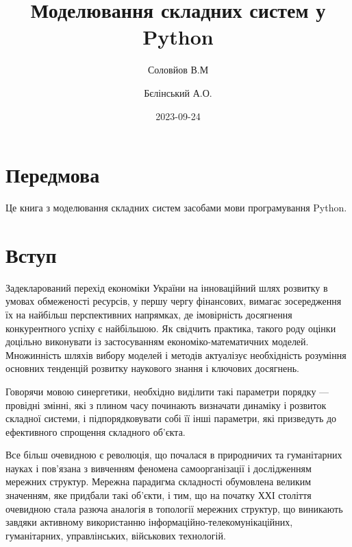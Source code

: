 \documentclass[
  letterpaper,
]{report}
\title{Моделювання складних систем у Python}
\author{Соловйов В.М \and Бєлінський А.О.}
\date{2023-09-24}
\renewcommand*\contentsname{Зміст}
\newcommand\contentsname{Зміст}
\begin{document}
\maketitle
\ifdefined\Shaded\renewenvironment{Shaded}{\begin{tcolorbox}[borderline west={3pt}{0pt}{shadecolor}, interior hidden, boxrule=0pt, breakable, frame hidden, enhanced, sharp corners]}{\end{tcolorbox}}\fi

\renewcommand*\contentsname{Зміст}
{
\hypersetup{linkcolor=}
\setcounter{tocdepth}{2}
\tableofcontents
}

\hypertarget{ux43fux435ux440ux435ux434ux43cux43eux432ux430}{%
\chapter*{Передмова}\label{ux43fux435ux440ux435ux434ux43cux43eux432ux430}}


Це книга з моделювання складних систем засобами мови програмування
Python.


\hypertarget{ux432ux441ux442ux443ux43f}{%
\chapter{Вступ}\label{ux432ux441ux442ux443ux43f}}

Задекларований перехід економіки України на інноваційний шлях розвитку в
умовах обмеженості ресурсів, у першу чергу фінансових, вимагає
зосередження їх на найбільш перспективних напрямках, де імовірність
досягнення конкурентного успіху є найбільшою. Як свідчить практика,
такого роду оцінки доцільно виконувати із застосуванням
економіко-математичних моделей. Множинність шляхів вибору моделей і
методів актуалізує необхідність розуміння основних тенденцій розвитку
наукового знання і ключових досягнень.

Говорячи мовою синергетики, необхідно виділити такі параметри порядку
--- провідні змінні, які з плином часу починають визначати динаміку і
розвиток складної системи, і підпорядковувати собі її інші параметри,
які призведуть до ефективного спрощення складного об'єкта.

Все більш очевидною є революція, що почалася в природничих та
гуманітарних науках і пов'язана з вивченням феномена самоорганізації і
дослідженням мережних структур. Мережна парадигма складності обумовлена
великим значенням, яке придбали такі об'єкти, і тим, що на початку ХХІ
століття очевидною стала разюча аналогія в топології мережних структур,
що виникають завдяки активному використанню
інформаційно-телекомунікаційних, гуманітарних, управлінських, військових
технологій.
\end{document}
